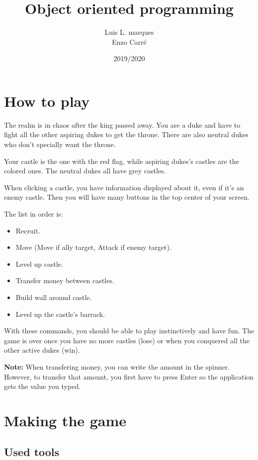\documentclass[12pt, a4paper]{report}
\title{Object oriented programming}
\author{Luis L. marques\\Enzo Carré}
\date{2019/2020}
\begin{document}
\maketitle
\tableofcontents

\newpage
\section*{How to play}

The realm is in chaos after the king passed away. You are a duke and have to fight all the other aspiring dukes to get the throne. There are also neutral dukes who don't specially want the throne.

Your castle is the one with the red flag, while aspiring dukes's castles are the colored ones. The neutral dukes all have grey castles.

When clicking a castle, you have information displayed about it, even if it's an enemy castle. Then you will have many buttons in the top center of your screen.

The list in order is:

\begin{itemize}
    \item Recruit.
    \item Move (Move if ally target, Attack if enemy target).
    \item Level up castle.
    \item Transfer money between castles.
    \item Build wall around castle.
    \item Level up the castle's barrack.
\end{itemize}

With these commands, you should be able to play instinctively and have fun. The game is over once you have no more castles (lose) or when you conquered all the other active dukes (win).

\textbf{Note:} When transfering money, you can write the amount in the spinner. However, to transfer that amount, you first have to press Enter so the application gets the value you typed.

\section*{Making the game}

\subsection*{Used tools}
\end{document}
